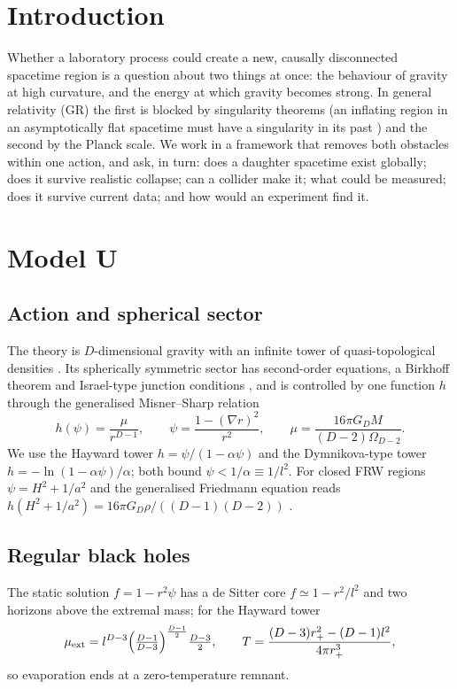 \documentclass[11pt,a4paper]{article}
\theoremstyle{remark}\newtheorem{remark}[theorem]{Remark}
\begin{document}
\section{Introduction}
Whether a laboratory process could create a new, causally disconnected spacetime region is a question about two things at once: the
behaviour of gravity at high curvature, and the energy at which gravity becomes strong. In general relativity (GR) the first is blocked by
singularity theorems (an inflating region in an asymptotically flat spacetime must have a singularity in its past \cite{FG87}) and the second
by the Planck scale. We work in a framework that removes both obstacles within one action, and ask, in turn: does a daughter spacetime
exist globally; does it survive realistic collapse; can a collider make it; what could be measured; does it survive current data; and
how would an experiment find it.

\section{Model U}
\subsection{Action and spherical sector}
The theory is $D$-dimensional gravity with an infinite tower of quasi-topological densities \cite{BCH24}. Its spherically symmetric sector
has second-order equations, a Birkhoff theorem and Israel-type junction conditions \cite{BCHM25a,BCHM25b}, and is controlled by one
function $h$ through the generalised Misner--Sharp relation
\begin{equation}
h(\psi)=\frac{\mu}{r^{D-1}},\qquad \psi=\frac{1-(\nabla r)^2}{r^2},\qquad \mu=\frac{16\pi G_D M}{(D-2)\Omega_{D-2}} .
\end{equation}
We use the Hayward tower $h=\psi/(1-\alpha\psi)$ and the Dymnikova-type tower $h=-\ln(1-\alpha\psi)/\alpha$; both bound
$\psi<1/\alpha\equiv1/l^2$. For closed FRW regions $\psi=H^2+1/a^2$ and the generalised Friedmann equation reads
$h(H^2+1/a^2)=16\pi G_D\rho/((D-1)(D-2))$ \cite{BCHMV25}.

\subsection{Regular black holes}
The static solution $f=1-r^2\psi$ has a de Sitter core $f\simeq1-r^2/l^2$ and two horizons above the extremal mass; for the Hayward tower
\begin{equation}
\mu_{\rm ext}=l^{D-3}\Big(\tfrac{D-1}{D-3}\Big)^{\frac{D-1}{2}}\tfrac{D-3}{2},\qquad
T=\frac{(D-3)r_+^2-(D-1)l^2}{4\pi r_+^3},
\end{equation}
so evaporation ends at a zero-temperature remnant.
\end{document}
